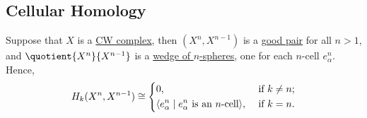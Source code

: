 \subsection{Cellular Homology}
Suppose that \(X\) is a \hyperref[def:CW-Complex]{CW complex}, then \((X^n, X^{n - 1})\) is a \hyperref[def:good-pair]{good pair} for all \(n > 1\), and
\(\quotient{X^n}{X^{n - 1}}\) is a \hyperref[CW-complex-wedge-sum]{wedge of \(n\)-spheres}, one for each \(n\)-cell \(e^n_\alpha\). Hence,
\[
	H_k(X^n, X^{n - 1}) \cong \begin{dcases}
		0,                                                                    & \text{ if } k\neq n ; \\
		\langle e_\alpha^n \mid  e_\alpha^n \text{ is an \(n\)-cell} \rangle, & \text{ if } k = n .
	\end{dcases}
\]

